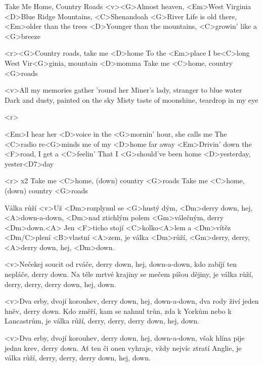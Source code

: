 \begin{song}{95}{Take Me Home, Country Roads}{}
	<v><G>Almost heaven, <Em>West Virginia
	<D>Blue Ridge Mountains, <C>Shenandoah <G>River
	Life is old there, <Em>older than the trees
	<D>Younger than the mountains, <C>growin' like a <G>breeze

	<r><G>Country roads, take me <D>home
	To the <Em>place I be<C>long
	West Vir<G>ginia, mountain <D>momma
	Take me <C>home, country <G>roads

	<v>All my memories gather 'round her
	Miner's lady, stranger to blue water
	Dark and dusty, painted on the sky
	Misty taste of moonshine, teardrop in my eye

	<r>

	<Em>I hear her <D>voice in the <G>mornin' hour, she calls me
	The <C>radio re<G>minds me of my <D>home far away
	<Em>Drivin' down the <F>road, I get a <C>feelin'
	That I <G>should've been home <D>yesterday, yester<D7>day

	<r> x2
	Take me <C>home, (down) country <G>roads
	Take me <C>home, (down) country <G>roads
\end{song}

\begin{song}{96}{Válka růží}{}
	<v>Už <Dm>rozplynul se <G>hustý dým,
	<Dm>derry down, hej, <A>down-a-down,
	<Dm>nad ztichlým polem <Gm>válečným, derry <Dm>down.<A>
	Jen <F>ticho stojí <C>kolko<A>lem a <Dm>vítěz <Dm/C>plení <B>vlastní <A>zem,
	je válka <Dm>růží, <Gm>derry, derry, <A>derry down, hej, <Dm>down.

	<v>Nečekej soucit od rváče,
	derry down, hej, down-a-down,
	kdo zabíjí ten nepláče,	derry down.
	Na těle mrtvé krajiny se mečem píšou dějiny,
	je válka růží, derry, derry, derry down, hej, down.

	<v>Dva erby, dvojí korouhev,
	derry down, hej, down-a-down,
	dva rody živí jeden hněv, derry down.
	Kdo změří, kam se nahnul trůn, zda k Yorkům nebo k Lancastrům,
	je válka růží, derry, derry, derry down, hej, down.

	<v>Dva erby, dvojí korouhev,
	derry down, hej, down-a-down,
	však hlína pije jednu krev, derry down.
	Ať ten či onen vyhraje, vždy nejvíc ztratí Anglie,
	je válka růží, derry, derry, derry down, hej, down.
\end{song}


